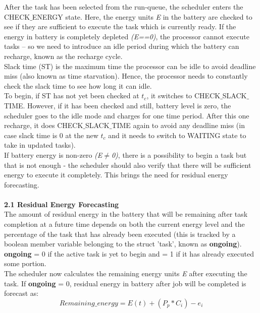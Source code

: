 \documentclass[12pt,hidelinks]{article}
\begin{document}
{After the task has been selected from the run-queue, the scheduler enters the CHECK$\_$ENERGY state. Here, the energy units \textit{E} in the battery are checked to see if they are sufficient to execute the task which is currently ready. If the energy in battery is completely depleted \textit{(E==0)}, the processor cannot execute tasks – so we need to introduce an idle period during which the battery can recharge, known as the  recharge cycle. \\

Slack time (ST) is the maximum time the processor can be idle to avoid deadline miss (also known as time starvation). Hence, the processor needs to constantly check the slack time to see how long it can idle.\\

To begin, if ST has not yet been checked at $t_c$, it switches to CHECK$\_$SLACK$\_$TIME. However, if it has been checked and still, battery level is zero, the scheduler goes to the idle mode and charges for one time period. After this one recharge, it does CHECK$\_$SLACK$\_$TIME again to avoid any deadline miss (in case slack time is 0 at the new $t_c$ and it needs to switch to WAITING state to take in updated tasks).\\

If battery energy is non-zero \textit{(E$\neq$0)}, there is a possibility to begin a task but that is not enough - the scheduler should also verify that there will be sufficient energy to execute it completely. This brings the need for residual energy forecasting. \\\\

\textbf{2.1 Residual Energy Forecasting}\\

The amount of residual energy in the battery that will be remaining after task completion at a future time depends on both the current energy level and the percentage of the task that has already been executed (this is tracked by a boolean member variable belonging to the struct 'task', known as \textbf{ongoing}). \\

\textbf{ongoing} = 0 if the active task is yet to begin and  = 1 if it has already executed some portion.\\

The scheduler now calculates the remaining energy units \textit{E} after executing the task. If \textbf{ongoing} = 0,  residual energy in battery after job will be completed is forecast as:
\begin{equation}
\textbf{$Remaining$\_$energy=E(t)+(P_p*C_i)-e_i$}    
\end{equation}

}
\end{document}
